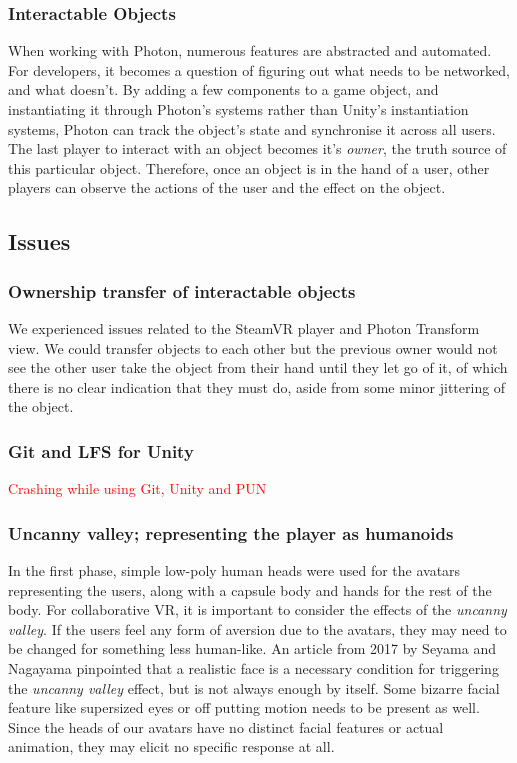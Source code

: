 \subsubsection{Interactable Objects}
When working with Photon, numerous features are abstracted and automated. For developers, it becomes a question of figuring out what needs to be networked, and what doesn't. By adding a few components to a game object, and instantiating it through Photon's systems rather than Unity's instantiation systems, Photon can track the object's state and synchronise it across all users. The last player to interact with an object becomes it's \textit{owner}, the truth source of this particular object. Therefore, once an object is in the hand of a user, other players can observe the actions of the user and the effect on the object.

\subsection{Issues}

\subsubsection{Ownership transfer of interactable objects}
We experienced issues related to the SteamVR player and Photon Transform view. We could transfer objects to each other but the previous owner would not see the other user take the object from their hand until they let go of it, of which there is no clear indication that they must do, aside from some minor jittering of the object.

\subsubsection{Git and LFS for Unity}
\textcolor{red}{Crashing while using Git, Unity and PUN}

\subsubsection{Uncanny valley; representing the player as humanoids}
In the first phase, simple low-poly human heads were used for the avatars representing the users, along with a capsule body and hands for the rest of the body. For collaborative VR, it is important to consider the effects of the \textit{uncanny valley}\cite{mori2012uncanny}. If the users feel any form of aversion due to the avatars, they may need to be changed for something less human-like. An article from 2017 by Seyama and Nagayama \cite{seyama2007uncanny} pinpointed that a realistic face is a necessary condition for triggering the \textit{uncanny valley} effect, but is not always enough by itself. Some bizarre facial feature like supersized eyes or off putting motion needs to be present as well. Since the heads of our avatars have no distinct facial features or actual animation, they may elicit no specific response at all.

